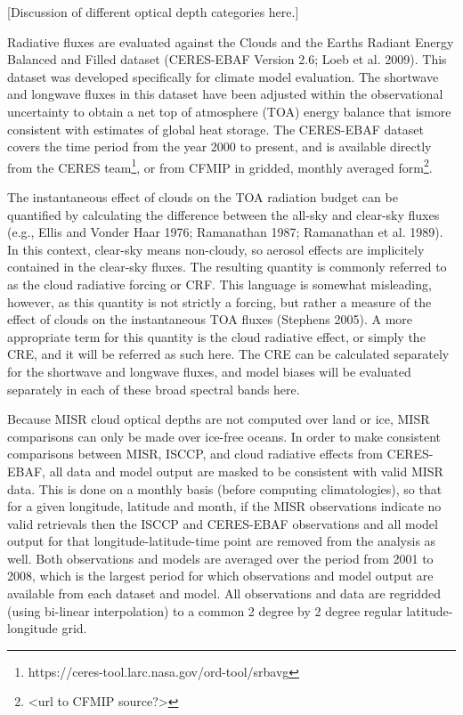 {[}Discussion of different optical depth categories here.{]}

Radiative fluxes are evaluated against the Clouds and the Earths Radiant
Energy Balanced and Filled dataset (CERES-EBAF Version 2.6; Loeb et al.
2009). This dataset was developed specifically for climate model
evaluation. The shortwave and longwave fluxes in this dataset have been
adjusted within the observational uncertainty to obtain a net top of
atmosphere (TOA) energy balance that ismore consistent with estimates of
global heat storage. The CERES-EBAF dataset covers the time period from
the year 2000 to present, and is available directly from the CERES
team\footnote{https://ceres-tool.larc.nasa.gov/ord-tool/srbavg}, or from
CFMIP in gridded, monthly averaged form\footnote{\textless{}url to CFMIP
  source?\textgreater{}}.

The instantaneous effect of clouds on the TOA radiation budget can be
quantified by calculating the difference between the all-sky and
clear-sky fluxes (e.g., Ellis and Vonder Haar 1976; Ramanathan 1987;
Ramanathan et al. 1989). In this context, clear-sky means non-cloudy, so
aerosol effects are implicitely contained in the clear-sky fluxes. The
resulting quantity is commonly referred to as the cloud radiative
forcing or CRF. This language is somewhat misleading, however, as this
quantity is not strictly a forcing, but rather a measure of the effect
of clouds on the instantaneous TOA fluxes (Stephens 2005). A more
appropriate term for this quantity is the cloud radiative effect, or
simply the CRE, and it will be referred as such here. The CRE can be
calculated separately for the shortwave and longwave fluxes, and model
biases will be evaluated separately in each of these broad spectral
bands here.

Because MISR cloud optical depths are not computed over land or ice,
MISR comparisons can only be made over ice-free oceans. In order to make
consistent comparisons between MISR, ISCCP, and cloud radiative effects
from CERES-EBAF, all data and model output are masked to be consistent
with valid MISR data. This is done on a monthly basis (before computing
climatologies), so that for a given longitude, latitude and month, if
the MISR observations indicate no valid retrievals then the ISCCP and
CERES-EBAF observations and all model output for that
longitude-latitude-time point are removed from the analysis as well.
Both observations and models are averaged over the period from 2001 to
2008, which is the largest period for which observations and model
output are available from each dataset and model. All observations and
data are regridded (using bi-linear interpolation) to a common 2 degree
by 2 degree regular latitude-longitude grid.

